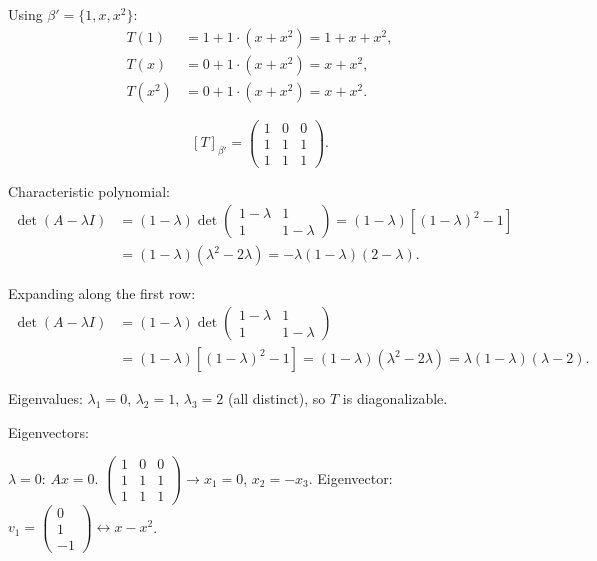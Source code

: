 \documentclass{article}
\begin{document}
\begin{mdframed}[linewidth=1pt]
Using $\beta' = \{1, x, x^2\}$:
\begin{align*}
T(1) &= 1 + 1 \cdot (x + x^2) = 1 + x + x^2, \\
T(x) &= 0 + 1 \cdot (x + x^2) = x + x^2, \\
T(x^2) &= 0 + 1 \cdot (x + x^2) = x + x^2.
\end{align*}

\[
[T]_{\beta'} = \begin{pmatrix} 1 & 0 & 0 \\ 1 & 1 & 1 \\ 1 & 1 & 1 \end{pmatrix}.
\]

\textnormal{Characteristic polynomial:}
\begin{align*}
\det(A - \lambda I) &= (1 - \lambda)\det\begin{pmatrix}1-\lambda & 1 \\ 1 & 1-\lambda\end{pmatrix} = (1-\lambda)[(1-\lambda)^2 - 1] \\
&= (1-\lambda)(\lambda^2 - 2\lambda) = -\lambda(1-\lambda)(2-\lambda).
\end{align*}

Expanding along the first row:
\begin{align*}
\det(A-\lambda I) &= (1-\lambda)\det\begin{pmatrix}1-\lambda&1\\1&1-\lambda\end{pmatrix} \\
&= (1-\lambda)[(1-\lambda)^2 - 1] = (1-\lambda)(\lambda^2 - 2\lambda) = \lambda(1-\lambda)(\lambda - 2).
\end{align*}

Eigenvalues: $\lambda_1 = 0$, $\lambda_2 = 1$, $\lambda_3 = 2$ (all distinct), so $T$ is \textnormal{diagonalizable}.

\textnormal{Eigenvectors:}

$\lambda = 0$: $Ax = 0$. $\begin{pmatrix}1&0&0\\1&1&1\\1&1&1\end{pmatrix} \to x_1 = 0$, $x_2 = -x_3$. Eigenvector: $v_1 = \begin{pmatrix}0\\1\\-1\end{pmatrix} \leftrightarrow x - x^2$.


\end{mdframed}
\end{document}

